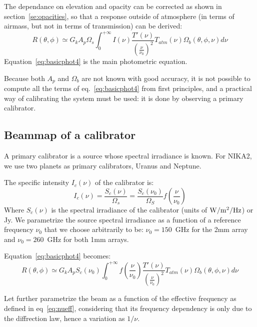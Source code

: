 The dependance on elevation and opacity can be corrected as shown in
section~\ref{se:opacities}, so that a response outside of atmosphere (in
terms of airmass, but not in terms of transmission) can be derived:
\begin{equation}
R(\theta, \phi) \simeq G_{k}  A_{p}\Omega_{s} \int_{0}^{+\infty} I(\nu)
\frac{T'(\nu)}{\left(\frac{\nu}{\nu_{0}}\right)^{2}} T_{atm}(\nu) \Omega_{b} (\theta, \phi, \nu)  d\nu 
\label{eq:basicphot4}
\end{equation}
Equation~\ref{eq:basicphot4} is the main photometric equation.

Because both $A_{p}$ and $ \Omega_{b} $ are not known with good
accuracy, it is not possible to compute all the terms of
eq.~\ref{eq:basicphot4} from first principles, and a practical way of
calibrating the system must be used: it is done by observing a primary
calibrator.

\subsection{Beammap of a calibrator}

A primary calibrator is a source whose spectral irradiance is
known. For NIKA2, we use two planets as primary calibrators, Uranus
and Neptune.



The specific intensity $I_{c}(\nu)$ of the
calibrator is:
\begin{equation}
I_{c}(\nu) =  \frac{S_{c}(\nu)}{\Omega_{s}} =\frac{ S_{c}
(\nu_{0})}{\Omega_{S}} f(\frac{\nu}{\nu_{0}})  
\end{equation}
Where $S_{c}(\nu)$ is the spectral irradiance of the calibrator (units
of $\rm W/m^{2}/Hz$) or Jy. We parametrize the source spectral irradiance
as a function of a reference frequency $\nu_{0}$ that we choose
arbitrarily to be: $\nu_{0} = 150$~GHz for the 2mm array and $\nu_{0}
= 260$~GHz for both 1mm arrays. 


Equation~\ref{eq:basicphot4} becomes:
\begin{equation}
R(\theta, \phi) \simeq G_{k}  A_{p}  S_{c} (\nu_{0}) \int_{0}^{+\infty} f(\frac{\nu}{\nu_{0}})  
\frac{T'(\nu)}{\left(\frac{\nu}{\nu_{0}}\right)^{2}} T_{atm}(\nu) \Omega_{b} (\theta, \phi, \nu)  d\nu 
\label{eq:basicphot5}
\end{equation}

Let further parametrize the beam as a function
of the effective frequency as defined in eq~\ref{eq:nueff},
considering that its frequency dependency is only due to the diffrection law,
hence a variation as $1/\nu$.


